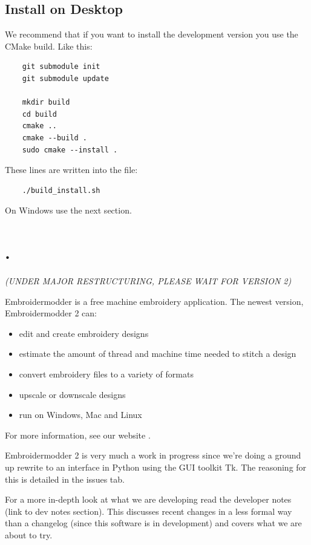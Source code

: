 \subsection{Install on Desktop}

We recommend that if you want to install the development version you use the CMake build. Like this:

\begin{lstlisting}
    git submodule init
    git submodule update

    mkdir build
    cd build
    cmake ..
    cmake --build .
    sudo cmake --install .
\end{lstlisting}

These lines are written into the file:

\begin{lstlisting}
    ./build_install.sh
\end{lstlisting}

On Windows use the next section.

\section{.}

\emph{(UNDER MAJOR RESTRUCTURING, PLEASE WAIT FOR VERSION 2)}

Embroidermodder is a free machine embroidery application.
The newest version, Embroidermodder 2 can:

\begin{itemize}
\item edit and create embroidery designs
\item estimate the amount of thread and machine time needed to stitch a design
\item convert embroidery files to a variety of formats
\item upscale or downscale designs
\item run on Windows, Mac and Linux
\end{itemize}

For more information, see our website \cite{thewebsite}.

Embroidermodder 2 is very much a work in progress since we're doing a ground up rewrite to an interface in Python using the GUI toolkit Tk. The reasoning for this is detailed in the issues tab.

For a more in-depth look at what we are developing read the developer notes (link to dev notes section). This discusses recent changes in a less formal way than a changelog (since this software is in development) and covers what we are about to try.

